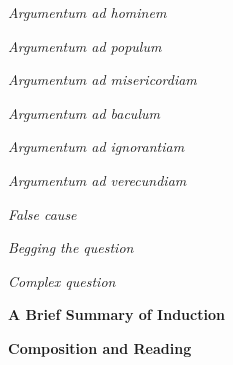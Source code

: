 \documentclass{report}
\begin{document}
\begin{outline}
\begin{outline}
\begin{outline}
      \begin{outline}
        \item \textit{Argumentum ad hominem}
        \item \textit{Argumentum ad populum}
        \item \textit{Argumentum ad misericordiam}
        \item \textit{Argumentum ad baculum}
        \item \textit{Argumentum ad ignorantiam}
        \item \textit{Argumentum ad verecundiam}
      \end{outline}
    \item \textit{False cause}
    \item \textit{Begging the question}
    \item \textit{Complex question}
    \end{outline}
  \end{outline}
    \item {\bf A Brief Summary of Induction}
  \item {\bf Composition and Reading}
\end{outline}
\end{document}
